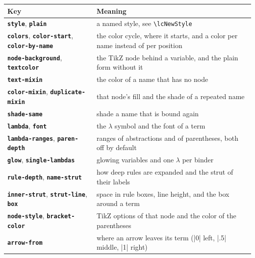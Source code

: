 \documentclass[parskip=half,english,numbers=noenddot,footnotes=nomultiple,oneside]{scrartcl}
\makeatletter
\newcommand\cmd[1]{\texttt{\textcolor{lccmd}{\textbackslash #1}}\index{#1@\texttt{\textbackslash #1}\string|hyperpage}}
\newcommand\opt[1]{\texttt{\textbf{#1}}\index{#1@\texttt{#1} (key)\string|hyperpage}}
\makeatother
\begin{document}
\begin{center}
\footnotesize
\begin{tabular}{@{}lp{.58\linewidth}@{}}
   \toprule
   \textbf{Key} & \textbf{Meaning} \\
   \midrule
   \opt{style}, \opt{plain} & a named style, see \cmd{lcNewStyle} \\
   \opt{colors}, \opt{color-start}, \opt{color-by-name} & the color cycle, where it starts, and a color per name instead of per position \\
   \opt{node-background}, \opt{textcolor} & the TikZ node behind a variable, and the plain form without it \\
   \opt{text-mixin} & the color of a name that has no node \\
   \opt{color-mixin}, \opt{duplicate-mixin} & that node's fill and the shade of a repeated name \\
   \opt{shade-same} & shade a name that is bound again \\
   \opt{lambda}, \opt{font} & the \(\lambda\) symbol and the font of a term \\
   \opt{lambda-ranges}, \opt{paren-depth} & ranges of abstractions and of parentheses, both off by default \\
   \opt{glow}, \opt{single-lambdas} & glowing variables and one \(\lambda\) per binder \\
   \opt{rule-depth}, \opt{name-strut} & how deep rules are expanded and the strut of their labels \\
   \opt{inner-strut}, \opt{strut-line}, \opt{box} & space in rule boxes, line height, and the box around a term \\
   \opt{node-style}, \opt{bracket-color} & TikZ options of that node and the color of the parentheses \\
   \opt{arrow-from} & where an arrow leaves its term (|0| left, |.5| middle, |1| right) \\
   \bottomrule
\end{tabular}
\end{center}
\end{document}
